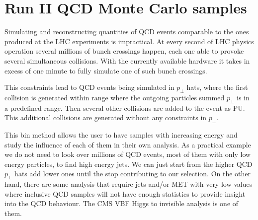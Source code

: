 % 
% 
% 
% 

\section{Run II QCD Monte Carlo samples}
\label{SECTION:RunIIQCDMonteCarloSamples}

Simulating and reconstructing quantities of \gls{QCD} events comparable to the ones produced at the \gls{LHC} experiments is impractical. At every second of \gls{LHC} physics operation several millions of bunch crossings happen, each one able to provoke several simultaneous collisions. With the currently available hardware it takes in excess of one minute to fully simulate one of such bunch crossings. 


This constraints lead to \gls{QCD} events being simulated in $p_\perp$ hats, where the first collision is generated within range where the outgoing particles summed $p_\perp$ is in a predefined range. Then several other collisions are added to the event as \gls{PU}. This additional collisions are generated without any constraints in $p_\perp$. 

This bin method allows the user to have samples with increasing energy and study the influence of each of them in their own analysis. As a practical example we do not need to look over millions of \gls{QCD} events, most of them with only low energy particles, to find high energy jets. We can just start from the higher \gls{QCD} $p_\perp$ hats add lower ones until the stop contributing to our selection. On the other hand, there are some analysis that require jets and/or \gls{MET} with very low values where inclusive \gls{QCD} samples will not have enough statistics to provide insight into the \gls{QCD} behaviour. The \gls{CMS} \gls{VBF} Higgs to invisible analysis is one of them.

